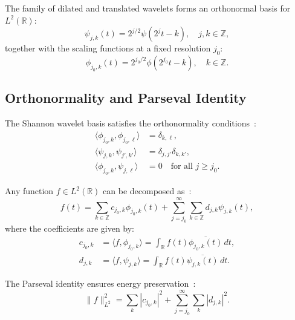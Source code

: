 The family of dilated and translated wavelets forms an orthonormal basis for $L^2(\mathbb{R})$:
\begin{equation}
\psi_{j,k}(t) = 2^{j/2}\psi(2^j t - k), \quad j,k \in \mathbb{Z},
\label{eq:wavelet_basis}
\end{equation}
together with the scaling functions at a fixed resolution $j_0$:
\begin{equation}
\phi_{j_0,k}(t) = 2^{j_0/2}\phi(2^{j_0} t - k), \quad k \in \mathbb{Z}.
\label{eq:scaling_basis}
\end{equation}

\subsection{Orthonormality and Parseval Identity}

The Shannon wavelet basis satisfies the orthonormality conditions~\cite{Daubechies1992}:
\begin{align}
\langle \phi_{j_0,k}, \phi_{j_0,\ell} \rangle &= \delta_{k,\ell}, \label{eq:scaling_ortho}\\
\langle \psi_{j,k}, \psi_{j',k'} \rangle &= \delta_{j,j'}\delta_{k,k'}, \label{eq:wavelet_ortho}\\
\langle \phi_{j_0,k}, \psi_{j,\ell} \rangle &= 0 \quad \text{for all } j \geq j_0. \label{eq:cross_ortho}
\end{align}

Any function $f \in L^2(\mathbb{R})$ can be decomposed as~\cite{Mallat1989}:
\begin{equation}
f(t) = \sum_{k \in \mathbb{Z}} c_{j_0,k} \phi_{j_0,k}(t) + \sum_{j=j_0}^{\infty}\sum_{k \in \mathbb{Z}} d_{j,k} \psi_{j,k}(t),
\label{eq:wavelet_decomp}
\end{equation}
where the coefficients are given by:
\begin{align}
c_{j_0,k} &= \langle f, \phi_{j_0,k} \rangle = \int_{\mathbb{R}} f(t) \overline{\phi_{j_0,k}(t)} \, dt, \label{eq:scaling_coeff}\\
d_{j,k} &= \langle f, \psi_{j,k} \rangle = \int_{\mathbb{R}} f(t) \overline{\psi_{j,k}(t)} \, dt. \label{eq:wavelet_coeff}
\end{align}

The Parseval identity ensures energy preservation~\cite{Walter1992}:
\begin{equation}
\|f\|_{L^2}^2 = \sum_{k} |c_{j_0,k}|^2 + \sum_{j=j_0}^{\infty}\sum_{k} |d_{j,k}|^2.
\label{eq:parseval}
\end{equation}

